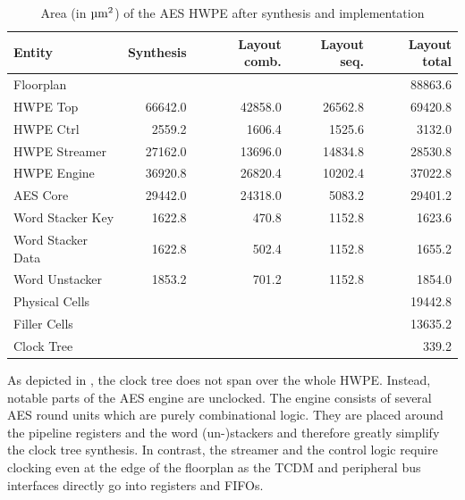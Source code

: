 \documentclass[a4paper, 12pt]{article}
\begin{document}
\begin{table}[h]
    \centering
    \begin{tabular}{l|r r r r}
        \toprule
        Entity &  Synthesis & Layout comb. & Layout seq. & Layout total \\
        \midrule
		Floorplan &  &  & & 88863.6 \\ 
		\hspace{2mm}HWPE Top & 66642.0 & 42858.0  & 26562.8 & 69420.8 \\ 
		\hspace{4mm}HWPE Ctrl & 2559.2 & 1606.4 & 1525.6 & 3132.0  \\ 
		\hspace{4mm}HWPE Streamer & 27162.0 & 13696.0 & 14834.8 & 28530.8 \\ 
		\hspace{4mm}HWPE Engine & 36920.8 & 26820.4 & 10202.4 & 37022.8 \\ 
		\hspace{6mm}AES Core & 29442.0 & 24318.0 & 5083.2 & 29401.2 \\ 
		\hspace{6mm}Word Stacker Key & 1622.8 & 470.8  & 1152.8 & 1623.6 \\ 
		\hspace{6mm}Word Stacker Data & 1622.8 & 502.4 & 1152.8 & 1655.2 \\ 
		\hspace{6mm}Word Unstacker & 1853.2 & 701.2 & 1152.8 & 1854.0 \\
		\hspace{2mm}Physical Cells &  &  & & 19442.8 \\ 
		\hspace{4mm}Filler Cells &  &  & & 13635.2 \\ 
		\hspace{4mm}Clock Tree &  &  & & 339.2\\ 
        \bottomrule
    \end{tabular}
	\caption{Area (in $\textrm{\micro m}^2$) of the AES HWPE after synthesis and implementation}
	\label{tab:results-area}
\end{table}

As depicted in , the clock tree does not span over the whole HWPE. Instead, notable parts of the AES engine are unclocked. The engine consists of several AES round units which are purely combinational logic. They are placed around the pipeline registers and the word (un-)stackers and therefore greatly simplify the clock tree synthesis. In contrast, the streamer and the control logic require clocking even at the edge of the floorplan as the TCDM and peripheral bus interfaces directly go into registers and FIFOs.
\end{document}
